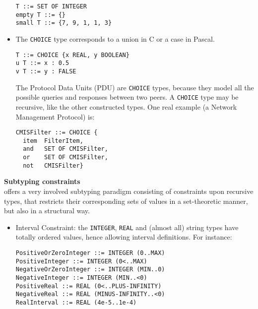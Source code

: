 \documentclass[12pt]{article}
\begin{document}
\begin{slide}
\begin{itemize}
\begin{verbatim}
T ::= SET OF INTEGER
empty T ::= {}
small T ::= {7, 9, 1, 1, 3}
\end{verbatim}


\pagebreak

  \item The \texttt{CHOICE} type corresponds to a \textsf{union} in
        C or a \textsf{case} in Pascal.

\begin{verbatim}
T ::= CHOICE {x REAL, y BOOLEAN}
u T ::= x : 0.5
v T ::= y : FALSE
\end{verbatim}


        The Protocol Data Units (PDU) are \texttt{CHOICE} types,
        because they model all the possible queries and responses
        between two peers. A \texttt{CHOICE} type may be recursive,
        like the other constructed types. One real example (a Network
        Management Protocol) is:

\begin{verbatim}
CMISFilter ::= CHOICE {
  item  FilterItem,
  and   SET OF CMISFilter,
  or    SET OF CMISFilter,
  not   CMISFilter}
\end{verbatim}

\end{itemize}

\pagebreak

\textbf{Subtyping constraints}\\

\ASN offers a very involved subtyping paradigm consisting of
constraints upon recursive types, that restricts their corresponding
sets of values in a set-theoretic manner, but also in a structural
way.

\begin{itemize}

  \item \textsf{Interval Constraint}: the \texttt{INTEGER},
        \texttt{REAL} and (almost all) string types have totally
        ordered values, hence allowing interval definitions. For
        instance:

\begin{verbatim}
PositiveOrZeroInteger ::= INTEGER (0..MAX)
PositiveInteger ::= INTEGER (0<..MAX)
NegativeOrZeroInteger ::= INTEGER (MIN..0)
NegativeInteger ::= INTEGER (MIN..<0)
PositiveReal ::= REAL (0<..PLUS-INFINITY)
NegativeReal ::= REAL (MINUS-INFINITY..<0)
RealInterval ::= REAL (4e-5..1e-4)
\end{verbatim}


\end{itemize}
\end{slide}
\end{document}
